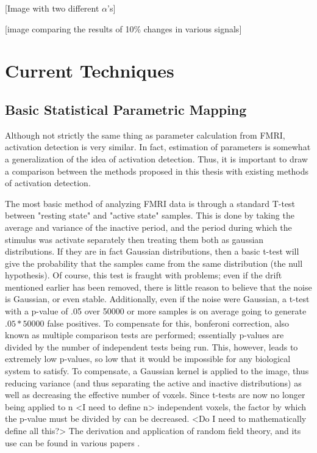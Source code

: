 \documentclass{article}
\begin{document}
[Image with two different $\alpha$'s]

[image comparing the results of 10\% changes in various signals]


\section{Current Techniques}
\subsection{Basic Statistical Parametric Mapping}
Although not strictly the same thing as parameter calculation from 
FMRI, activation detection is very similar. In fact, estimation of 
parameters is somewhat a generalization of the idea of activation detection.
Thus, it is important to draw a comparison between the methods proposed
in this thesis with existing methods of activation detection.

The most basic method of analyzing FMRI data is through a standard T-test
between "resting state" and "active state" samples. This is done by 
taking the average and variance of the inactive period, and the 
period during which the stimulus was activate separately then treating 
them both as gaussian distributions.
If they are in fact Gaussian distributions, then a basic t-test will
give the probability that the samples came from the same distribution
(the null hypothesis). Of course, this test is fraught with problems; even if
the drift mentioned earlier has been removed, there is little reason
to believe that the noise is Gaussian, or even stable. Additionally, 
even if the noise were Gaussian, a t-test with a p-value of .05 over
50000 or more samples is on average going to generate $.05*50000$ false
positives. To compensate for this, bonferoni correction, also known as
multiple comparison tests are performed; essentially p-values are 
divided by the number of independent
tests being run. This, however, leads to extremely low p-values, so
low that it would be impossible for any biological system to satisfy. To
compensate, a Gaussian kernel is applied to the image, thus reducing
variance (and thus separating the active and inactive distributions)
as well as decreasing the effective number of voxels. Since t-tests are
now no longer being applied to n <I need to define n> independent voxels,
the factor by which the p-value must be divided by can be decreased.
<Do I need to mathematically define all this?> The derivation and application
of random field theory, and its use can be found in various papers \cite{univ_mult_rft}.
\end{document}
